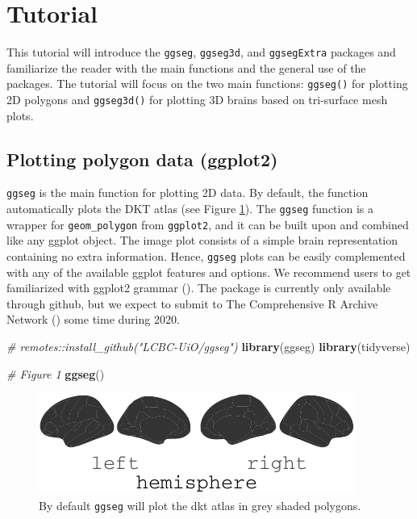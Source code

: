 \documentclass[fleqn,10pt]{wlpeerj} %
\newenvironment{Shaded}{\begin{snugshade}}{\end{snugshade}}
\newcommand{\CommentTok}[1]{\textcolor[rgb]{0.56,0.35,0.01}{\textit{#1}}}
\newcommand{\KeywordTok}[1]{\textcolor[rgb]{0.13,0.29,0.53}{\textbf{#1}}}
\newcommand{\NormalTok}[1]{#1}
\begin{document}
\hypertarget{tutorial}{%
\section{Tutorial}\label{tutorial}}

This tutorial will introduce the \texttt{ggseg}, \texttt{ggseg3d}, and \texttt{ggsegExtra} packages and familiarize the reader with the main functions and the general use of the packages.
The tutorial will focus on the two main functions: \texttt{ggseg()} for plotting 2D polygons and \texttt{ggseg3d()} for plotting 3D brains based on tri-surface mesh plots.

\hypertarget{plotting-polygon-data-ggplot2}{%
\subsection{Plotting polygon data (ggplot2)}\label{plotting-polygon-data-ggplot2}}

\texttt{ggseg} is the main function for plotting 2D data.
By default, the function automatically plots the DKT atlas (see Figure \ref{fig:init}).
The \texttt{ggseg} function is a wrapper for \texttt{geom\_polygon} from \texttt{ggplot2}, and it can be built upon and combined like any ggplot object.
The image plot consists of a simple brain representation containing no extra information.
Hence, \texttt{ggseg} plots can be easily complemented with any of the available ggplot features and options.
We recommend users to get familiarized with ggplot2 grammar (\citet{ggplot}).
The package is currently only available through github, but we expect to submit to The Comprehensive R Archive Network (\citet{cran}) some time during 2020.

\begin{Shaded}
\begin{Highlighting}[]
\CommentTok{# remotes::install_github("LCBC-UiO/ggseg")}
\KeywordTok{library}\NormalTok{(ggseg)}
\KeywordTok{library}\NormalTok{(tidyverse)}

\CommentTok{# Figure 1}
\KeywordTok{ggseg}\NormalTok{()}
\end{Highlighting}
\end{Shaded}

\begin{figure}
\centering
\includegraphics{draft_2_files/figure-latex/init-1.pdf}
\caption{\label{fig:init}By default \texttt{ggseg} will plot the dkt atlas in grey shaded polygons.}
\end{figure}
\end{document}
